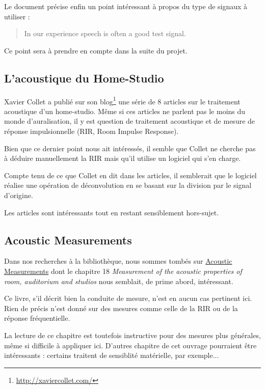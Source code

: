 \documentclass[12pt]{article}
\begin{document}
Le document précise enfin un point intéressant à propos du type de signaux à utiliser :

\begin{quotation}
In our experience speech is often a good test signal.
\end{quotation}

Ce point sera à prendre en compte dans la suite du projet. 

\subsection{L'acoustique du Home-Studio}

Xavier Collet a publié sur son blog\footnote{\url{http://xaviercollet.com/}} une série de 8 articles sur le traitement acoustique d'un home-studio. Même si ces articles ne parlent pas le moins du monde d'auralisation, il y est question de traitement acoustique et de mesure de réponse impulsionnelle (RIR, Room Impulse Response).

Bien que ce dernier point nous ait intéressés, il semble que Collet ne cherche pas à déduire manuellement la RIR mais qu'il utilise un logiciel qui s'en charge.

Compte tenu de ce que Collet en dit dans les articles, il semblerait que le logiciel réalise une opération de déconvolution en se basant sur la division par le signal d'origine.

Les articles sont intéressants tout en restant sensiblement hors-sujet.

\subsection{Acoustic Measurements}

Dans nos recherches à la bibliothèque, nous sommes tombés sur \underline{Acoustic Measurements} dont le chapitre 18 \textit{Measurement of the acoustic properties of room, auditorium and studios} nous semblait, de prime abord, intéressant.

Ce livre, s'il décrit bien la conduite de mesure, n'est en aucun cas pertinent ici. Rien de précis n'est donné sur des mesures comme celle de la RIR ou de la réponse fréquentielle.

La lecture de ce chapitre est toutefois instructive pour des mesures plus générales, même si difficile à appliquer ici.
D'autres chapitre de cet ouvrage pourraient être intéressants : certains traitent de sensiblité matérielle, par exemple...
\end{document}
